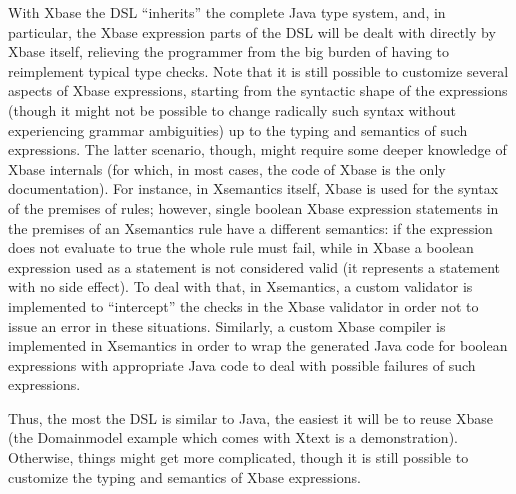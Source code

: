 With Xbase the DSL ``inherits'' the complete Java type system, and, in
particular, the Xbase expression parts of the DSL will be dealt with directly by
Xbase itself, relieving the programmer from the big burden of having to
reimplement typical type checks.  Note that it is still possible to customize
several aspects of Xbase expressions, starting from the syntactic shape of the
expressions (though it might not be possible to change radically such syntax
without experiencing grammar ambiguities) up to the typing and semantics of such
expressions.  The latter scenario, though, might require some deeper knowledge
of Xbase internals (for which, in most cases, the code of Xbase is the only
documentation).  For instance, in Xsemantics itself, Xbase is used for the
syntax of the premises of rules; however, single boolean Xbase expression
statements in the premises of an Xsemantics rule have a different semantics: if
the expression does not evaluate to true the whole rule must fail, while in
Xbase a boolean expression used as a statement is not considered valid (it
represents a statement with no side effect).  To deal with that, in Xsemantics,
a custom validator is implemented to ``intercept'' the checks in the Xbase
validator in order not to issue an error in these situations.
Similarly, a custom Xbase compiler is implemented in Xsemantics in order to wrap
the generated Java code for boolean expressions with appropriate Java code to
deal with possible failures of such expressions.

Thus, the most the DSL is similar to Java, the easiest it will be to reuse Xbase
(the Domainmodel example which comes with Xtext is a demonstration).  Otherwise,
things might get more complicated, though it is still possible to customize the
typing and semantics of Xbase expressions.

